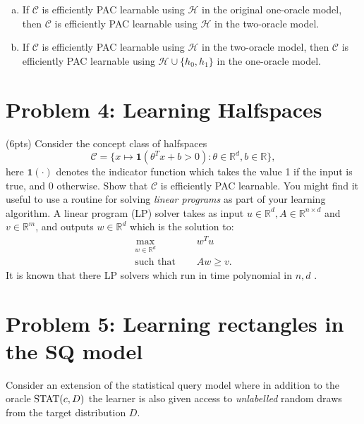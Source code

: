 \documentclass[11pt]{article}
\newcommand{\calC}{{\mathcal{C}}}
\newcommand{\calH}{{\mathcal{H}}}
\newcommand{\blue}[1]{{\color{blue}#1}}
\newcommand{\R}{\mathbb{R}}
\newcommand{\indicator}{\mathbf{1}}
\newcommand{\statoracle}{{\text{\rm STAT}}}
\begin{document}
\begin{enumerate}[(a)] 
    \item If $\calC$ is efficiently PAC learnable using $\calH$ in the original one-oracle model, then $\calC$ is efficiently PAC learnable using $\calH $ in the two-oracle model.
    \item If $\calC$ is efficiently PAC learnable using $\calH$ in the two-oracle model, then $\calC$ is efficiently PAC learnable using $\calH  \cup \{h_0,h_1\}$ in the one-oracle model.
    
\end{enumerate}


\section*{Problem 4: Learning Halfspaces}


 (\blue{6pts}) Consider the concept class of halfspaces 
    \[
    \calC = \{ x \mapsto
 \indicator(\theta^T x + b>0): \theta \in \R^d, b \in \R \},
    \]
    here $\indicator(\cdot)$ denotes the indicator function which takes the value 1 if the input is true, and 0 otherwise.
Show that $\calC$ is efficiently PAC learnable. You might find it useful to use a routine for solving \emph{linear programs} as part of your learning algorithm. A linear program (LP) solver takes as input $u \in \R^d, A \in \R^{n \times d}$ and $ v \in \R^m$, and outputs $w \in \R^d$ which is the solution to:
\begin{align*}
    \max_{w \in \R^d}\quad & w^Tu\\
    \text{such that }\quad & Aw\ge v.
\end{align*}
It is known that there LP solvers which run in time polynomial in $n,d$ \cite{karmarkar1984new}.


\section*{Problem 5: Learning rectangles in the SQ model}

Consider an extension of the statistical query model where in addition to the oracle $\statoracle(c,D)$ the learner is also given access to \emph{unlabelled} random draws from the target distribution $D$.
\end{document}
